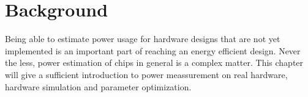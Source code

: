 \chapter{Background}
Being able to estimate power usage for hardware designs that are not yet
implemented is an important part of reaching an energy efficient design. Never
the less, power estimation of chips in general is a complex matter. This chapter
will give a sufficient introduction to power meassurement on real hardware,
hardware simulation and parameter optimization.





